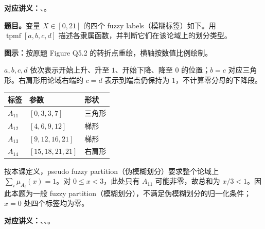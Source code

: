 \textbf{对应讲义：}、。

\textbf{题目。}变量 $X\in[0,21]$ 的四个 fuzzy labels（模糊标签）如下。用 $\operatorname{tpmf}[a,b,c,d]$ 描述各隶属函数，并判断它们在该论域上的划分类型。
\begin{center}

\end{center}
\textbf{图示：}按原题 Figure Q5.2 的转折点重绘，横轴按数值比例绘制。

\begin{checkedsolution}
$a,b,c,d$ 依次表示开始上升、升至 $1$、开始下降、降至 $0$ 的位置；$b=c$ 对应三角形。右肩形用论域右端的 $c=d$ 表示到端点仍保持为 $1$，不计算零分母的下降段。
\begin{center}
\begin{tabular}{@{}lll@{}}
\toprule
标签 & 参数 & 形状 \\
\midrule
$A_{11}$ & $[0,3,3,7]$ & 三角形 \\
$A_{12}$ & $[4,6,9,12]$ & 梯形 \\
$A_{13}$ & $[9,12,16,21]$ & 梯形 \\
$A_{14}$ & $[15,18,21,21]$ & 右肩形 \\
\bottomrule
\end{tabular}
\end{center}
按本课定义，pseudo fuzzy partition（伪模糊划分）要求整个论域上 $\sum_i\mu_{A_i}(x)=1$。对 $0\le x<3$，此处只有 $A_{11}$ 可能非零，故总和为 $x/3<1$。因此本题为一般 fuzzy partition（模糊划分），不满足伪模糊划分的归一化条件；$x=0$ 处四个标签均为零。
\end{checkedsolution}

\textbf{对应讲义：}、、。


